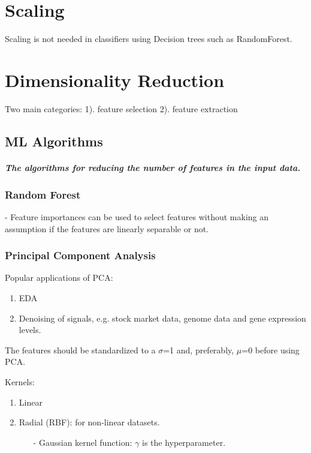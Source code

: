 \documentclass[a4paper, 12pt]{report}
\begin{document}
\chapter{Scaling}
Scaling is not needed in classifiers using Decision trees such as RandomForest.



\chapter{Dimensionality Reduction}

Two main categories: 1). feature selection 2). feature extraction

\section{ML Algorithms}
\paragraph{The algorithms for reducing the number of features in the input data.}

\subsection{Random Forest}
\label{randomforest}
- Feature importances can be used to select features without making an assumption if the features are linearly separable or not.

\subsection{Principal Component Analysis}
\label{PCA}

Popular applications of PCA:
\begin{enumerate}
\item EDA
\item Denoising of signals, e.g. stock market data, genome data and gene expression levels.
\end{enumerate}

The features should be standardized to a $\sigma$=1 and, preferably, $\mu$=0 before using PCA. 

\vspace{12pt}
Kernels:
\begin{enumerate} %

\item {\color{red}Linear}
\item {\color{red}Radial (RBF)}: for non-linear datasets.
\begin{itemize}
\item[-] Gaussian kernel function: $\gamma$ is the hyperparameter.
\end{itemize}

\end{enumerate}
\end{document}
